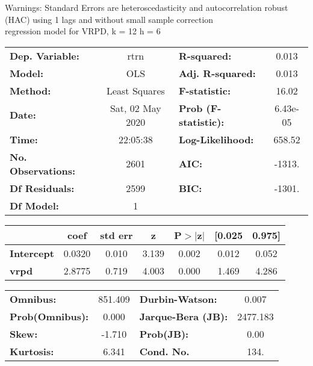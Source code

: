 Warnings: \newline
 [1] Standard Errors are heteroscedasticity and autocorrelation robust (HAC) using 1 lags and without small sample correction\\ 

regression model for VRPD, k = 12 h = 6\begin{center}
\begin{tabular}{lclc}
\toprule
\textbf{Dep. Variable:}    &       rtrn       & \textbf{  R-squared:         } &     0.013   \\
\textbf{Model:}            &       OLS        & \textbf{  Adj. R-squared:    } &     0.013   \\
\textbf{Method:}           &  Least Squares   & \textbf{  F-statistic:       } &     16.02   \\
\textbf{Date:}             & Sat, 02 May 2020 & \textbf{  Prob (F-statistic):} &  6.43e-05   \\
\textbf{Time:}             &     22:05:38     & \textbf{  Log-Likelihood:    } &    658.52   \\
\textbf{No. Observations:} &        2601      & \textbf{  AIC:               } &    -1313.   \\
\textbf{Df Residuals:}     &        2599      & \textbf{  BIC:               } &    -1301.   \\
\textbf{Df Model:}         &           1      & \textbf{                     } &             \\
\bottomrule
\end{tabular}
\begin{tabular}{lcccccc}
                   & \textbf{coef} & \textbf{std err} & \textbf{z} & \textbf{P$> |$z$|$} & \textbf{[0.025} & \textbf{0.975]}  \\
\midrule
\textbf{Intercept} &       0.0320  &        0.010     &     3.139  &         0.002        &        0.012    &        0.052     \\
\textbf{vrpd}      &       2.8775  &        0.719     &     4.003  &         0.000        &        1.469    &        4.286     \\
\bottomrule
\end{tabular}
\begin{tabular}{lclc}
\textbf{Omnibus:}       & 851.409 & \textbf{  Durbin-Watson:     } &    0.007  \\
\textbf{Prob(Omnibus):} &   0.000 & \textbf{  Jarque-Bera (JB):  } & 2477.183  \\
\textbf{Skew:}          &  -1.710 & \textbf{  Prob(JB):          } &     0.00  \\
\textbf{Kurtosis:}      &   6.341 & \textbf{  Cond. No.          } &     134.  \\
\bottomrule
\end{tabular}
\end{center}

